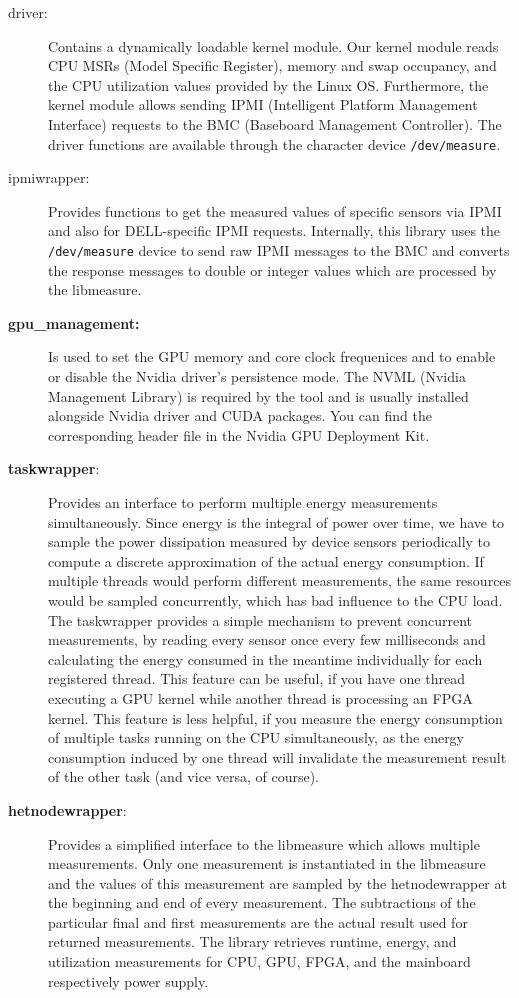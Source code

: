 \begin{description}
	\item[driver:] Contains a dynamically loadable kernel module. Our kernel module reads CPU MSRs (Model Specific Register), memory and swap occupancy, and the CPU utilization values provided by the Linux OS. Furthermore, the kernel module allows sending IPMI (Intelligent Platform Management Interface) requests to the BMC (Baseboard Management Controller). The driver functions are available through the character device \texttt{/dev/measure}.
	
	\item[ipmiwrapper:] Provides functions to get the measured values of specific sensors via IPMI and also for DELL-specific IPMI requests. Internally, this library uses the \texttt{/dev/measure} device to send raw IPMI messages to the BMC and converts the response messages to double or integer values which are processed by the libmeasure. 
	
	\item[\textbf{gpu\_management:}] Is used to set the GPU memory and core clock frequenices and to enable or disable the Nvidia driver's persistence mode. The NVML (Nvidia Management Library) is required by the tool and is usually installed alongside Nvidia driver and CUDA packages. You can find the corresponding header file in the Nvidia GPU Deployment Kit.
	
	\item[\textbf{taskwrapper}:] Provides an interface to perform multiple energy measurements simultaneously. Since energy is the integral of power over time, we have to sample the power dissipation measured by device sensors periodically to compute a discrete approximation of the actual energy consumption. If multiple threads would perform different measurements, the same resources would be sampled concurrently, which has bad influence to the CPU load. The taskwrapper provides a simple mechanism to prevent concurrent measurements, by reading every sensor once every few milliseconds and calculating the energy consumed in the meantime individually for each registered thread. This feature can be useful, if you have one thread executing a GPU kernel while another thread is processing an FPGA kernel. This feature is less helpful, if you measure the energy consumption of multiple tasks running on the CPU simultaneously, as the energy consumption induced by one thread will invalidate the measurement result of the other task (and vice versa, of course).
	
	\item[\textbf{hetnodewrapper}:] Provides a simplified interface to the libmeasure which allows multiple measurements. Only one measurement is instantiated in the libmeasure and the values of this measurement are sampled by the hetnodewrapper at the beginning and end of every measurement. The subtractions of the particular final and first measurements are the actual result used for returned measurements. The library retrieves runtime, energy, and utilization measurements for CPU, GPU, FPGA, and the mainboard respectively power supply.
	

\end{description}
